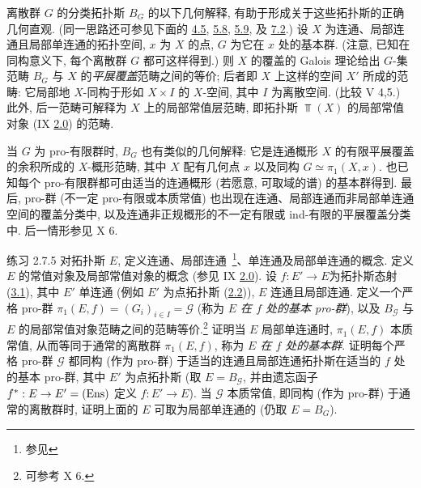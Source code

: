 \subsubsection{}
离散群 $G$ 的分类拓扑斯 $B_G$ 的以下几何解释, 有助于形成关于这些拓扑斯的正确几何直观. (同一思路还可参见下面的 \hyperref[IV.subsec4.5]{4.5}, \hyperref[IV.subsec5.8]{5.8}, \hyperref[IV.exer5.9]{5.9}, 及 \hyperref[IV.subsec7.2]{7.2}.)
设 $X$ 为连通、局部连通且\pageoriginale 局部单连通的拓扑空间, $x$ 为 $X$ 的点, $G$ 为它在 $x$ 处的基本群. (注意, 已知在同构意义下, 每个离散群 $G$ 都可这样得到.) 则 $X$ 的覆盖的 Galois 理论给出 $G$-集范畴 $B_G$ 与 $X$ 的\emph{平展覆盖}范畴之间的等价; 后者即 $X$ 上这样的空间 $X'$ 所成的范畴: 它局部地 $X$-同构于形如 $X\times I$ 的 $X$-空间, 其中 $I$ 为离散空间. (比较  V 4,5.) 此外, 后一范畴可解释为 $X$ 上的局部常值层范畴, 即拓扑斯 $\Top(X)$ 的局部常值对象 (IX \hyperref[IX.subsec2.0]{2.0}) 的范畴.

当 $G$ 为 pro-有限群时, $B_G$ 也有类似的几何解释: 它是连通概形 $X$ 的有限平展覆盖的余积所成的 $X$-概形范畴, 其中 $X$ 配有几何点 $x$ 以及同构 $G\simeq \pi_1(X,x)$. 也已知每个 pro-有限群都可由适当的连通概形 (若愿意, 可取域的谱) 的基本群得到. 最后, pro-群 (不一定 pro-有限或本质常值) 也出现在连通、局部连通而非局部单连通空间的覆盖分类中, 以及连通非正规概形的不一定有限或 ind-有限的平展覆盖分类中. 后一情形参见  X 6.

\begin{enonce*}[remark]{练习 2.7.5}
对拓扑斯 $E$, 定义连通、局部连通~\footnote[1]{参见 }、单连通及局部单连通的概念. 定义 $E$ 的常值对象及局部常值对象的概念 (参见 IX \hyperref[IX.subsec2.0]{2.0}). 设 $f:E'\rightarrow E$\pageoriginale 为拓扑斯态射 (\hyperref[IV.def3.1]{3.1}), 其中 $E'$ 单连通 (例如 $E'$ 为点拓扑斯 (\hyperref[IV.subsec2.2]{2.2})), $E$ 连通且局部连通. 定义一个严格 pro-群 $\pi_1(E,f)=(G_i)_{i\in I}=𝒢$ (称为 \emph{$E$ 在 $f$ 处的基本 pro-群}), 以及 $B_{𝒢}$ 与 $E$ 的局部常值对象范畴之间的范畴等价.\footnote[2]{可参考  X 6.} 证明当 $E$ 局部单连通时, $\pi_1(E,f)$ 本质常值, 从而等同于通常的离散群 $\pi_1(E,f)$, 称为 \emph{$E$ 在 $f$ 处的基本群}. 证明每个严格 pro-群 $𝒢$ 都同构 (作为 pro-群) 于适当的连通且局部连通拓扑斯在适当的 $f$ 处的基本 pro-群, 其中 $E'$ 为点拓扑斯 (取 $E=B_{𝒢}$, 并由遗忘函子 $f^{\ast}:E\rightarrow E'=(\operatorname{Ens})$ 定义 $f:E'\rightarrow E$). 当 $𝒢$ 本质常值, 即同构 (作为 pro-群) 于通常的离散群时, 证明上面的 $E$ 可取为局部单连通的 (仍取 $E=B_G$).
\end{enonce*}

